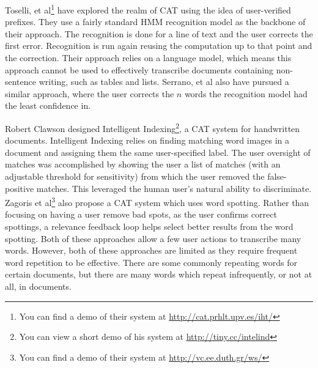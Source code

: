 \documentclass[conference]{IEEEtran}
\begin{document}
Toselli, et al\cite{Toselli2010}\footnote{You can find a demo of their system at \url{http://cat.prhlt.upv.es/iht/}} have explored the realm of CAT using the idea of user-verified prefixes. They use a fairly standard HMM recognition model as the backbone of their approach. The recognition is done for a line of text and the user corrects the first error. Recognition is run again reusing the computation up to that point and the correction. Their approach relies on a language model, which means this approach cannot be used to effectively transcribe documents containing non-sentence writing, such as tables and lists. Serrano, et al also have pursued a similar approach, where the user corrects the $n$ words the recognition model had the least confidence in\cite{Serrano2014}.

Robert Clawson designed Intelligent Indexing\cite{Clawson2014}\footnote{You can view a short demo of his system at \url{http://tiny.cc/intelind}}, a CAT system for handwritten documents. Intelligent Indexing relies on finding matching word images in a document and assigning them the same user-specified label.
The user oversight of matches was accomplished by showing the user a list of matches (with an adjustable threshold for sensitivity) from which the user removed the false-positive matches. This leveraged the human user's natural ability to discriminate. Zagoris et al\cite{Zagoris2015}\footnote{You can find a demo of their system at \url{http://vc.ee.duth.gr/ws/}} also propose a CAT system which uses word spotting. Rather than focusing on having a user remove bad spots, as the user confirms correct spottings, a relevance feedback loop helps select better results from the word spotting. Both of these approaches allow a few user actions to transcribe many words. However, both of these approaches are limited as they require frequent word repetition to be effective. There are some commonly repeating words for certain documents, but there are many words which repeat infrequently, or not at all, in documents.


\end{document}
